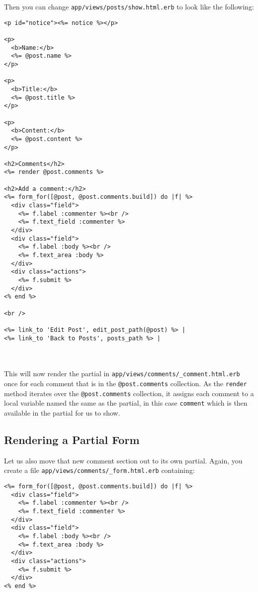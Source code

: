 \documentclass[10pt]{book}
\begin{document}
Then you can change \texttt{app/views/posts/show.html.erb} to look like the following:

\begin{minipage}{\textwidth}
\begin{verbatim}
<p id="notice"><%= notice %></p>
 
<p>
  <b>Name:</b>
  <%= @post.name %>
</p>
 
<p>
  <b>Title:</b>
  <%= @post.title %>
</p>
 
<p>
  <b>Content:</b>
  <%= @post.content %>
</p>
 
<h2>Comments</h2>
<%= render @post.comments %>
 
<h2>Add a comment:</h2>
<%= form_for([@post, @post.comments.build]) do |f| %>
  <div class="field">
    <%= f.label :commenter %><br />
    <%= f.text_field :commenter %>
  </div>
  <div class="field">
    <%= f.label :body %><br />
    <%= f.text_area :body %>
  </div>
  <div class="actions">
    <%= f.submit %>
  </div>
<% end %>
 
<br />
 
<%= link_to 'Edit Post', edit_post_path(@post) %> |
<%= link_to 'Back to Posts', posts_path %> |
\end{verbatim}
\end{minipage}
\\ \\

This will now render the partial in \texttt{app/views/comments/\_comment.html.erb} once for each comment that is in the \texttt{@post.comments} collection. As the \texttt{render} method iterates over the \texttt{@post.comments} collection, it assigns each comment to a local variable named the same as the partial, in this case \texttt{comment} which is then available in the partial for us to show.

\subsection{ Rendering a Partial Form}

Let us also move that new comment section out to its own partial. Again, you create a file \texttt{app/views/comments/\_form.html.erb} containing:


\begin{verbatim}
<%= form_for([@post, @post.comments.build]) do |f| %>
  <div class="field">
    <%= f.label :commenter %><br />
    <%= f.text_field :commenter %>
  </div>
  <div class="field">
    <%= f.label :body %><br />
    <%= f.text_area :body %>
  </div>
  <div class="actions">
    <%= f.submit %>
  </div>
<% end %>
\end{verbatim}
\end{document}
